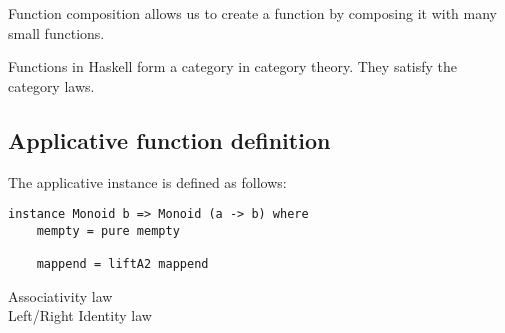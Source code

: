 \documentclass[twoside, a4paper]{article}
\begin{document}
Function composition allows us to create a function by composing it with many small functions. 

Functions in Haskell form a category in category theory. They satisfy the category laws.

\subsection{Applicative function definition}
 The applicative instance is defined as follows:
\begin{verbatim}
instance Monoid b => Monoid (a -> b) where
    mempty = pure mempty

    mappend = liftA2 mappend
\end{verbatim}

\begin{description}
\item[Associativity law] 
\item[Left/Right Identity law] 
\end{description}



\printglossary
\end{document}
